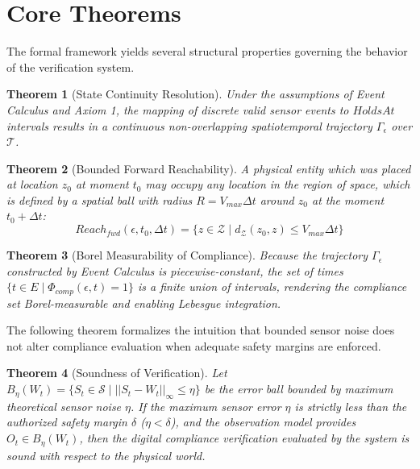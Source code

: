 \documentclass[conference]{IEEEtran}
\newtheorem{theorem}{Theorem}
\newcommand{\Z}{\mathcal{Z}} %
\newcommand{\T}{\mathcal{T}} %
\newcommand{\Sstate}{\mathcal{S}} %
\newcommand{\Tr}{\Gamma} %
\begin{document}
\section{Core Theorems}

The formal framework yields several structural properties governing the behavior of the verification system.

\begin{theorem}[State Continuity Resolution]
Under the assumptions of Event Calculus and Axiom 1, the mapping of discrete valid sensor events to $HoldsAt$ intervals results in a continuous non-overlapping spatiotemporal trajectory $\Gamma_\epsilon$ over $\T$.
\end{theorem}

\begin{theorem}[Bounded Forward Reachability]
A physical entity which was placed at location $z_0$ at moment $t_0$ may occupy any location in the region of space, which is defined by a spatial ball with radius $R = V_{max}\Delta t$ around $z_0$ at the moment $t_0+\Delta t$:
\begin{equation}
Reach_{fwd}(\epsilon, t_0, \Delta t) = \{ z \in \Z \mid d_\Z(z_0, z) \le V_{max} \Delta t \}
\end{equation}
\end{theorem}

\begin{theorem}[Borel Measurability of Compliance]
Because the trajectory $\Tr_\epsilon$ constructed by Event Calculus is piecewise-constant, the set of times $\{ t \in E \mid \Phi_{comp}(\epsilon, t) = 1 \}$ is a finite union of intervals, rendering the compliance set Borel-measurable and enabling Lebesgue integration.
\end{theorem}

The following theorem formalizes the intuition that bounded sensor noise does not alter compliance evaluation when adequate safety margins are enforced.

\begin{theorem}[Soundness of Verification]
Let $B_\eta(W_t) = \{ S_t \in \Sstate \mid ||S_t - W_t||_\infty \le \eta \}$ be the error ball bounded by maximum theoretical sensor noise $\eta$. If the maximum sensor error $\eta$ is strictly less than the authorized safety margin $\delta$ ($\eta < \delta$), and the observation model provides $O_t \in B_\eta(W_t)$, then the digital compliance verification evaluated by the system is sound with respect to the physical world.
\end{theorem}
\end{document}
